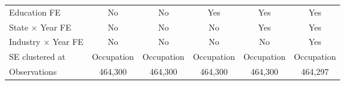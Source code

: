 \begin{tabular}{l*{5}{c}}
Education FE&          No   &          No   &         Yes   &         Yes   &         Yes   \\
State $\times$ Year FE&          No   &          No   &          No   &         Yes   &         Yes   \\
Industry $\times$ Year FE&          No   &          No   &          No   &          No   &         Yes   \\
SE clustered at&  Occupation   &  Occupation   &  Occupation   &  Occupation   &  Occupation   \\
Observations&     464,300   &     464,300   &     464,300   &     464,300   &     464,297   \\
\bottomrule
\end{tabular}
